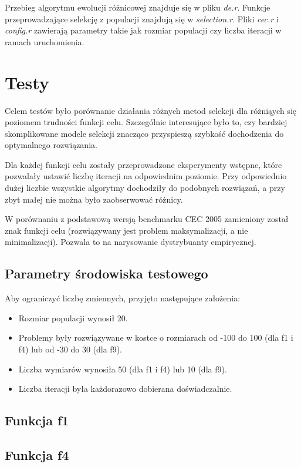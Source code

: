 \documentclass[11pt]{article}
\begin{document}
Przebieg algorytmu ewolucji różnicowej znajduje się w pliku \emph{de.r}.
Funkcje przeprowadzające selekcję z populacji znajdują się w \emph{selection.r}.
Pliki \emph{cec.r} i \emph{config.r} zawierają parametry takie jak rozmiar populacji czy liczba iteracji w ramach uruchomienia.

\section{Testy}
Celem testów było porównanie działania różnych metod selekcji dla różniąych się poziomem trudności funkcji celu.
Szczególnie interesujące było to, czy bardziej skomplikowane modele selekcji znacząco przyspieszą szybkość dochodzenia do optymalnego rozwiązania.

Dla każdej funkcji celu zostały przeprowadzone eksperymenty wstępne, które pozwalały ustawić liczbę iteracji na odpowiednim poziomie.
Przy odpowiednio dużej liczbie wszystkie algorytmy dochodziły do podobnych rozwiązań, a przy zbyt małej nie można było zaobserwować różnicy.

W porównaniu z podstawową wersją benchmarku CEC 2005 zamieniony został znak funkcji celu (rozwiązywany jest problem maksymalizacji, a nie minimalizacji).
Pozwala to na narysowanie dystrybuanty empirycznej.

\subsection{Parametry środowiska testowego}
Aby ograniczyć liczbę zmiennych, przyjęto następujące założenia:
\begin{itemize}
 \item Rozmiar populacji wynosił 20.
 \item Problemy były rozwiązywane w kostce o rozmiarach od -100 do 100 (dla f1 i f4) lub od -30 do 30 (dla f9).
 \item Liczba wymiarów wynosiła 50 (dla f1 i f4) lub 10 (dla f9).
 \item Liczba iteracji była każdorazowo dobierana doświadczalnie.
\end{itemize}

\subsection{Funkcja f1}

\subsection{Funkcja f4}
\end{document}
